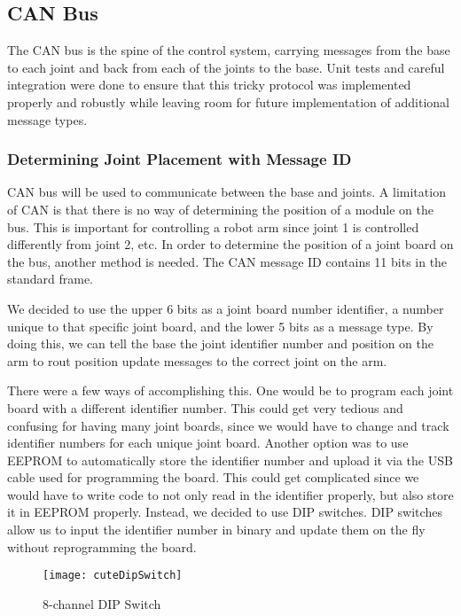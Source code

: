 \subsection{CAN Bus}
The CAN bus is the spine of the control system, carrying messages from the base to each joint and back from each of the joints to the base. Unit tests and careful integration were done to ensure that this tricky protocol was implemented properly and robustly while leaving room for future implementation of additional message types.

\subsubsection{Determining Joint Placement with Message ID}
CAN bus will be used to communicate between the base and joints. A limitation of CAN is that there is no way of determining the position of a module on the bus. This is important for controlling a robot arm since joint 1 is controlled differently from joint 2, etc. In order to determine the position of a joint board on the bus, another method is needed. The CAN message ID contains 11 bits in the standard frame.

\noindent We decided to use the upper 6 bits as a joint board number identifier, a number unique to that specific joint board, and the lower 5 bits as a message type. By doing this, we can tell the base the joint identifier number and position on the arm to rout position update messages to the correct joint on the arm.

\noindent There were a few ways of accomplishing this. One would be to program each joint board with a different identifier number. This could get very tedious and confusing for having many joint boards, since we would have to change and track identifier numbers for each unique joint board. Another option was to use EEPROM to automatically store the identifier number and upload it via the USB cable used for programming the board. This could get complicated since we would have to write code to not only read in the identifier properly, but also store it in EEPROM properly. Instead, we decided to use DIP switches. DIP switches allow us to input the identifier number in binary and update them on the fly without reprogramming the board.

\begin{figure}[H]
\centering
\texttt{[image: cuteDipSwitch]}
\caption{8-channel DIP Switch}
\label{fig:8_channel DIP Switch}
\end{figure}


